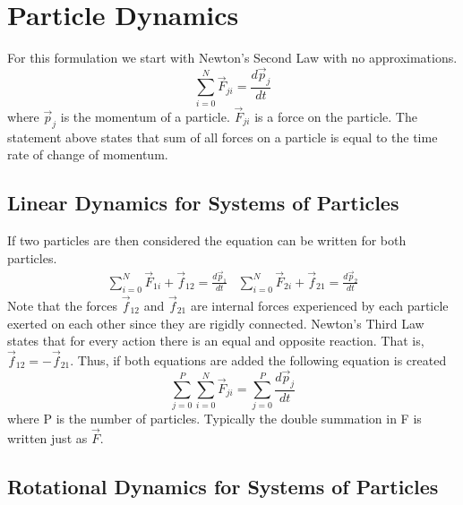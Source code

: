 \documentclass{article}
\begin{document}
\tableofcontents

\newpage

\section{Particle Dynamics}
For this formulation we start with Newton's Second Law with no
approximations\cite{multibody}.
\begin{equation}
\sum\limits_{i=0}^N \vec{F}_{ji} = \frac{d\vec{p}_j}{dt}
\end{equation}
where $\vec{p}_j$ is the momentum of a particle. $\vec{F}_{ji}$ is a
force on the particle. The statement above states that sum of all
forces on a particle is equal to the time rate of change of
momentum. 

\subsection{Linear Dynamics for Systems of Particles}
If two particles are then considered the equation can
be written for both particles.
\begin{equation}
\begin{matrix}
\sum\limits_{i=0}^N \vec{F}_{1i} + \vec{f}_{12} = \frac{d\vec{p}_1}{dt} &
\sum\limits_{i=0}^N \vec{F}_{2i} + \vec{f}_{21} = \frac{d\vec{p}_2}{dt} 
\end{matrix}
\end{equation}
Note that the forces $\vec{f}_{12}$ and $\vec{f}_{21}$ are internal forces
experienced by each particle exerted on each other since they are
rigidly connected. Newton's Third Law states that for every action
there is an equal and opposite reaction. That is, $\vec{f}_{12} = -\vec{f}_{21}$. Thus, if both equations are added the following equation is
created
\begin{equation}
\sum\limits_{j=0}^P \sum\limits_{i=0}^N \vec{F}_{ji} =
\sum\limits_{j=0}^P \frac{d\vec{p}_j}{dt}
\end{equation}
where P is the number of particles. Typically the double summation
in F is written just as $\vec{F}$. 

\subsection{Rotational Dynamics for Systems of Particles}
\end{document}
